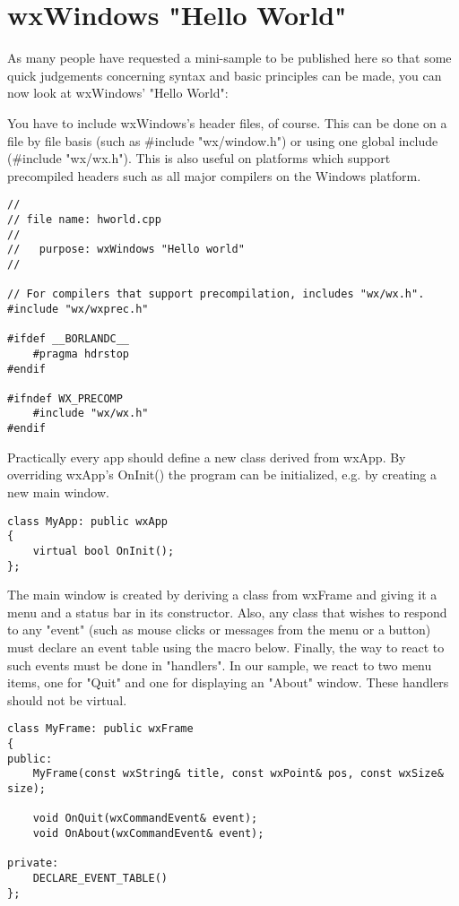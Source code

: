 \section{wxWindows "Hello World"}\label{helloworld}

As many people have requested a mini-sample to be published here
so that some quick judgements concerning syntax
and basic principles can be made, you can now look at wxWindows'
"Hello World":

You have to include wxWindows's header files, of course. This can
be done on a file by file basis (such as \#include "wx/window.h")
or using one global include (\#include "wx/wx.h"). This is
also useful on platforms which support precompiled headers such
as all major compilers on the Windows platform.

\begin{verbatim}
//
// file name: hworld.cpp
//
//   purpose: wxWindows "Hello world"
//

// For compilers that support precompilation, includes "wx/wx.h".
#include "wx/wxprec.h"

#ifdef __BORLANDC__
    #pragma hdrstop
#endif

#ifndef WX_PRECOMP
    #include "wx/wx.h"
#endif
\end{verbatim}

Practically every app should define a new class derived from wxApp.
By overriding wxApp's OnInit() the program can be initialized,
e.g. by creating a new main window. 

\begin{verbatim}
class MyApp: public wxApp
{
    virtual bool OnInit();
};
\end{verbatim}

The main window is created by deriving a class from wxFrame and 
giving it a menu and a status bar in its constructor. Also, any class
that wishes to respond to any "event" (such as mouse clicks or
messages from the menu or a button) must declare an event table 
using the macro below. Finally, the way to react to such events 
must be done in "handlers". In our sample, we react to two menu items, 
one for "Quit" and one for displaying an "About" window. These
handlers should not be virtual.

\begin{verbatim}
class MyFrame: public wxFrame
{
public:
    MyFrame(const wxString& title, const wxPoint& pos, const wxSize& size);

    void OnQuit(wxCommandEvent& event);
    void OnAbout(wxCommandEvent& event);

private:
    DECLARE_EVENT_TABLE()
};
\end{verbatim}

